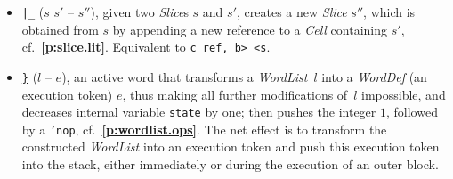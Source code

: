 \documentclass[12pt,oneside]{article}
\def\refpoint#1{{\rm\textbf{\ref{#1}}}}
\let\ptref=\refpoint
\begin{document}
\begin{itemize}
\item {\tt |\_} ($s$ $s'$ -- $s''$), given two {\em Slice\/}s $s$ and $s'$, creates a new {\em Slice\/} $s''$, which is obtained from $s$ by appending a new reference to a {\em Cell\/} containing $s'$, cf.~\ptref{p:slice.lit}. Equivalent to {\tt <b rot s, swap s>c ref, b> <s}.
\item {\tt \underline{\}}} ($l$ -- $e$), an active word that transforms a {\em WordList\/}~$l$ into a {\em WordDef\/} (an execution token) $e$, thus making all further modifications of~$l$ impossible, and decreases internal variable {\tt state} by one; then pushes the integer $1$, followed by a {\tt 'nop}, cf.~\ptref{p:wordlist.ops}. The net effect is to transform the constructed {\em WordList\/} into an execution token and push this execution token into the stack, either immediately or during the execution of an outer block.
\end{itemize}
\end{document}

